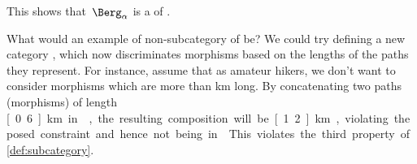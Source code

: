 {This shows that~$\Berg_\alpha$ is a  of \Berg.

What would an example of non-subcategory of \Berg be?
We could try defining a new category \Berglazy, which now discriminates morphisms based on the lengths of the paths they represent.
For instance, assume that as amateur hikers, we don't want to consider morphisms which are more than \unit[1]{km} long.
By concatenating two paths (morphisms) of length \unit[0.6]{km} in \Berglazy, the resulting composition will be \unit[1.2]{km}, violating the posed constraint and hence not being in \Berglazy.
This violates the third property of \cref{def:subcategory}.

}









